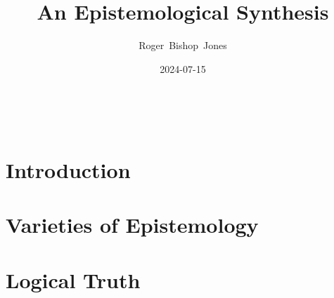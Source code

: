 \documentclass[10pt,titlepage]{book}
\title{\bf\LARGE An Epistemological Synthesis}
\author{Roger~Bishop~Jones}
\date{\small 2024-07-15}
\newcommand{\ignore}[1]{}
\begin{document}

%
                               
\begin{titlepage}
\maketitle





\end{titlepage}

\ \

\ignore{
\begin{centering}
{}
\end{centering}
}%

\setcounter{tocdepth}{2}
{\parskip-0pt\tableofcontents}




\chapter{Introduction}




\chapter{Varieties of Epistemology}



\chapter{Logical Truth}




{}



\label{index}
{\twocolumn[]
{\small\printindex}}





\end{document}
